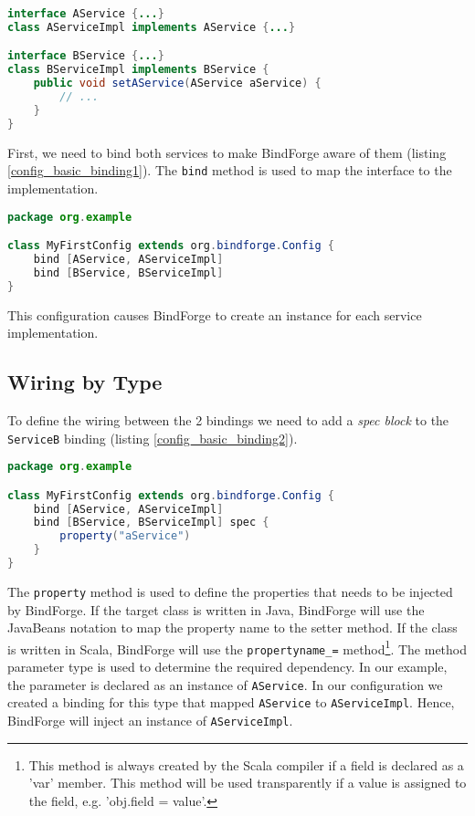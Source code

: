\begin{lstlisting}[caption={Example classes},label=config_basic_binding_classes,language=Java]
interface AService {...}
class AServiceImpl implements AService {...}

interface BService {...}
class BServiceImpl implements BService {
    public void setAService(AService aService) {
        // ...
    }
}
\end{lstlisting}

First, we need to bind both services to make BindForge aware of them (listing \ref{config_basic_binding1}). The \verb!bind! method is used to map the interface to the implementation. 

\begin{lstlisting}[caption={Simple bindings},label=config_basic_binding1,language=Java]
package org.example

class MyFirstConfig extends org.bindforge.Config {
    bind [AService, AServiceImpl]
    bind [BService, BServiceImpl]
}
\end{lstlisting}

This configuration causes BindForge to create an instance for each service implementation. 

\subsection{Wiring by Type}

To define the wiring between the 2 bindings we need to add a \textit{spec block} to the \verb!ServiceB! binding (listing \ref{config_basic_binding2}).

\begin{lstlisting}[caption={Simple bindings},label=config_basic_binding2,language=Java]
package org.example

class MyFirstConfig extends org.bindforge.Config {
    bind [AService, AServiceImpl]
    bind [BService, BServiceImpl] spec {
        property("aService")
    }
}
\end{lstlisting}

The \verb!property! method is used to define the properties that needs to be injected by BindForge. If the target class is written in Java, BindForge will use the JavaBeans notation to map the property name to the setter method. If the class is written in Scala, BindForge will use the \verb!propertyname_=! method\footnote{This method is always created by the Scala compiler if a field is declared as a 'var' member. This method will be used transparently if a value is assigned to the field, e.g. 'obj.field = value'.}. The method parameter type is used to determine the required dependency. In our example, the parameter is declared as an instance of \verb!AService!. In our configuration we created a binding for this type that mapped \verb!AService! to \verb'AServiceImpl'. Hence, BindForge will inject an instance of \verb!AServiceImpl!.

